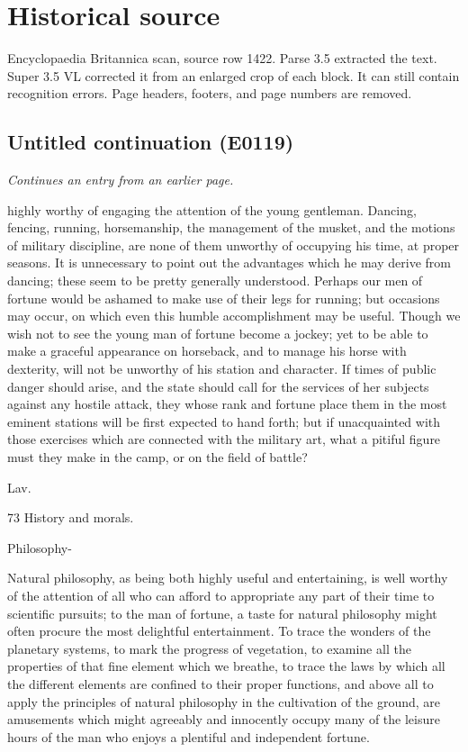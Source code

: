\documentclass{article}
\begin{document}
\section*{Historical source}
Encyclopaedia Britannica scan, source row 1422. Parse 3.5 extracted the text. Super 3.5 VL corrected it from an enlarged crop of each block. It can still contain recognition errors.
Page headers, footers, and page numbers are removed.

\subsection*{Untitled continuation (E0119)}
\textit{Continues an entry from an earlier page.}

highly worthy of engaging the attention of the young gentleman. Dancing, fencing, running, horsemanship, the management of the musket, and the motions of military discipline, are none of them unworthy of occupying his time, at proper seasons. It is unnecessary to point out the advantages which he may derive from dancing; these seem to be pretty generally understood. Perhaps our men of fortune would be ashamed to make use of their legs for running; but occasions may occur, on which even this humble accomplishment may be useful. Though we wish not to see the young man of fortune become a jockey; yet to be able to make a graceful appearance on horseback, and to manage his horse with dexterity, will not be unworthy of his station and character. If times of public danger should arise, and the state should call for the services of her subjects against any hostile attack, they whose rank and fortune place them in the most eminent stations will be first expected to hand forth; but if unacquainted with those exercises which are connected with the military art, what a pitiful figure must they make in the camp, or on the field of battle?

Lav.

73
History and
morals.

Philosophy-

Natural philosophy, as being both highly useful and entertaining, is well worthy of the attention of all who can afford to appropriate any part of their time to scientific pursuits; to the man of fortune, a taste for natural philosophy might often procure the most delightful entertainment. To trace the wonders of the planetary systems, to mark the progress of vegetation, to examine all the properties of that fine element which we breathe, to trace the laws by which all the different elements are confined to their proper functions, and above all to apply the principles of natural philosophy in the cultivation of the ground, are amusements which might agreeably and innocently occupy many of the leisure hours of the man who enjoys a plentiful and independent fortune.
\end{document}
